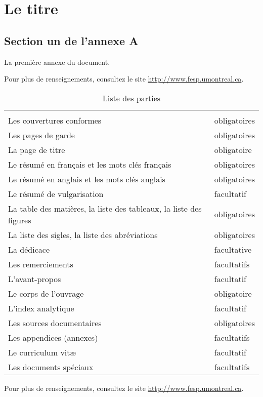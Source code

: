 \chapter{Le titre}

\section{Section un de l'annexe A}

La premi\`ere annexe du document.

Pour plus de renseignements, consultez le site \url{http://www.fesp.umontreal.ca}.
\begin{table}[htb]
	\renewcommand{\arraystretch}{1.25}
	\newcommand{\dotrule}[1]{\parbox[t]{#1}{\dotfill}}
	\centering
	\caption[Titre alternatif pour la table des mati\`eres]{Liste des parties}
	\label{tab:parties}
	\begin{tabular}{p{}@{\hspace{}}p{0.15\textwidth}}
		\hline\hline & \\[-3mm]
  		Les couvertures conformes 											& obligatoires			\\
		Les pages de garde 													& obligatoires			\\
		La page de titre 													& obligatoire			\\
		Le résumé en français et les mots clés français						& obligatoires			\\
		Le résumé en anglais et les mots clés anglais 						& obligatoires			\\
		Le résumé de vulgarisation											& facultatif			\\
		La table des mati\`eres, la liste des tableaux, la liste des figures 	& obligatoires			\\
		La liste des sigles, la liste des abréviations						& obligatoires			\\
		La dédicace															& facultative			\\
		Les remerciements 													& facultatifs			\\
		L'avant-propos 														& facultatif			\\
		Le corps de l'ouvrage												& obligatoire			\\
		L'index analytique													& facultatif			\\
		Les sources documentaires 											& obligatoires			\\
		Les appendices (annexes) 											& facultatifs			\\
		Le curriculum vit\ae{}												& facultatif			\\
		Les documents spéciaux 												& facultatifs			\\
		[3mm] \hline\hline
	\end{tabular}
\end{table}
Pour plus de renseignements, consultez le site \url{http://www.fesp.umontreal.ca}.
